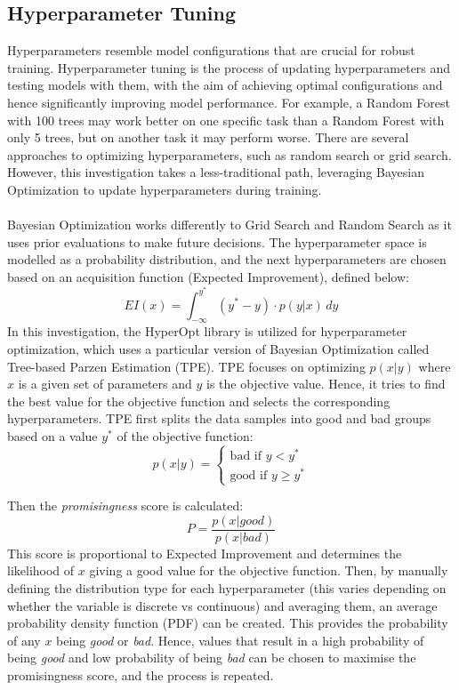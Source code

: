 \documentclass[a4paper]{report}
\begin{document}
\subsection{Hyperparameter Tuning}
Hyperparameters resemble model configurations that are crucial for robust training. Hyperparameter tuning is the process 
of updating hyperparameters and testing models with them, with the aim of achieving optimal configurations and hence significantly improving model performance. For example, a Random Forest with 100 trees may 
work better on one specific task than a Random Forest with only 5 trees, but on another task it may perform worse. There are 
several approaches to optimizing hyperparameters, such as random search or grid search. However, this investigation takes a less-traditional path, leveraging Bayesian Optimization
to update hyperparameters during training. \\\\Bayesian Optimization works differently to Grid Search and Random Search as it uses prior evaluations 
to make future decisions. The hyperparameter space is modelled as a probability distribution, and the next hyperparameters are chosen based on an acquisition function (Expected Improvement), defined below:
\begin{equation}
  EI(x) = \int_{-\infty}^{y^*} (y^*-y) \cdot p(y | x) \, dy
\end{equation}  
In this investigation, the HyperOpt library is utilized for hyperparameter
optimization, which uses a particular version of Bayesian Optimization called Tree-based Parzen Estimation (TPE). TPE focuses on optimizing
\(p(x|y)\) where \(x\) is a given set of parameters and \(y\) is the objective value. Hence, it tries to find the best value for the objective function and selects the corresponding hyperparameters.
TPE first splits the data samples into good and bad groups based on a value \(y^*\) of the objective function:
\begin{equation}
  p(x|y) = \begin{cases}
  \text{bad if } y < y^* \\
  \text{good if } y \geq y^*
  \end{cases}
\end{equation}
  
Then the \textit{promisingness} score is calculated:
\begin{equation}
  P = \frac{p(x | good)}{p(x | bad)}
\end{equation}
This score is proportional to Expected Improvement and determines the likelihood of 
\(x\) giving a good value for the objective function. Then, by manually defining the distribution type 
for each hyperparameter (this varies depending on whether the variable is discrete vs continuous) and averaging them,
an average probability density function (PDF) can be created. This provides the probability of any \(x\) being 
\textit{good} or \textit{bad}. Hence, values that result in a high probability of being \textit{good} and low probability 
of being \textit{bad} can be chosen to maximise the promisingness score, and the process is repeated.
\end{document}
